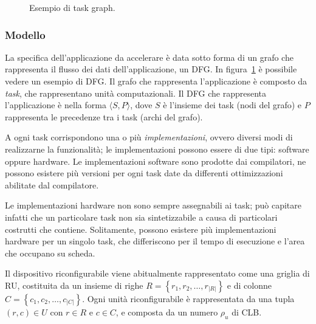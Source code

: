 \begin{figure}[ht]
\begin{center}
\caption{Esempio di task graph.}
\label{fig:taskGraphExample}
\end{center}
\end{figure}

\subsubsection{Modello}

La specifica dell'applicazione da accelerare è data sotto forma di un grafo che
rappresenta il flusso dei dati dell'applicazione, un \ac{DFG}. In
figura~\ref{fig:taskGraphExample} è possibile vedere un esempio di \ac{DFG}. Il grafo che
rappresenta l'applicazione è composto da \emph{task}, che rappresentano unità
computazionali. Il \ac{DFG} che rappresenta l'applicazione è nella forma
$\langle S, P \rangle$, dove $S$ è l'insieme dei task (nodi del grafo) e $P$
rappresenta le precedenze tra i task (archi del grafo).

A ogni task corrispondono una o più \emph{implementazioni}, ovvero diversi modi di
realizzarne la funzionalità; le implementazioni possono essere di due tipi: software
oppure hardware. Le implementazioni software sono prodotte dai compilatori, ne possono
esistere più versioni per ogni task date da differenti ottimizzazioni abilitate dal
compilatore.

Le implementazioni hardware non sono sempre assegnabili ai task; può capitare infatti
che un particolare task non sia sintetizzabile a causa di particolari costrutti che
contiene. Solitamente, possono esistere più implementazioni hardware per un singolo task,
che differiscono per il tempo di esecuzione e l'area che occupano su scheda.

Il dispositivo riconfigurabile viene abitualmente rappresentato come una griglia di \ac{RU}, 
costituita da un insieme di righe $R=\left\{r_1, r_2, \dots, r_{\vert R \vert}\right\}$ e 
di colonne $C=\left\{c_1, c_2, \dots, c_{\vert C \vert}\right\}$. Ogni unità 
riconfigurabile è rappresentata da una tupla $(r,c) \in U$ con $r \in R$ e $c \in C$, e 
composta da un numero $\rho_{u}$ di \ac{CLB}.

